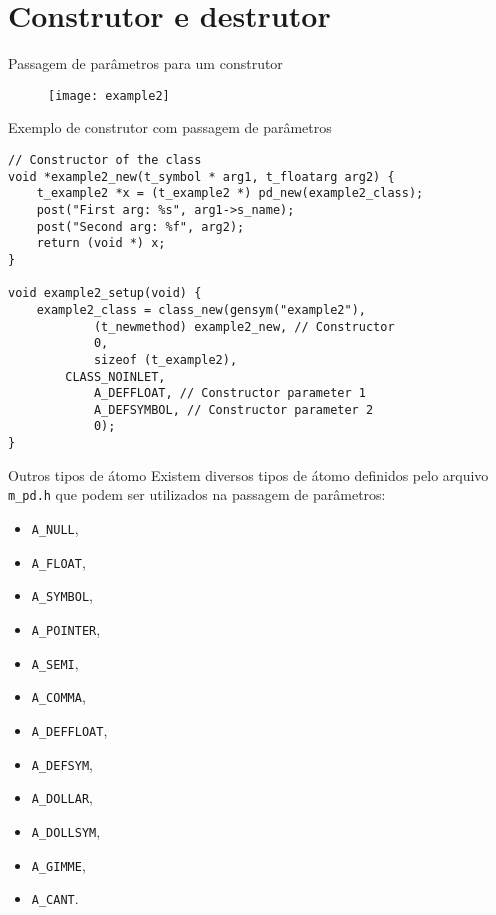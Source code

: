 \section{Construtor e destrutor}


\begin{frame}{Passagem de parâmetros para um construtor}
\begin{figure}
\centering
\texttt{[image: example2]}
\end{figure}
\end{frame}


\begin{frame}[fragile]{Exemplo de construtor com passagem de parâmetros}
\begin{lstlisting}
// Constructor of the class
void *example2_new(t_symbol * arg1, t_floatarg arg2) {
    t_example2 *x = (t_example2 *) pd_new(example2_class);
    post("First arg: %s", arg1->s_name);
    post("Second arg: %f", arg2);
    return (void *) x;
}

void example2_setup(void) {
    example2_class = class_new(gensym("example2"),
            (t_newmethod) example2_new, // Constructor
            0,
            sizeof (t_example2),
	    CLASS_NOINLET,
            A_DEFFLOAT, // Constructor parameter 1
            A_DEFSYMBOL, // Constructor parameter 2
            0);
}
\end{lstlisting}
\end{frame}


\begin{frame}{Outros tipos de átomo}
Existem diversos tipos de átomo definidos pelo arquivo \texttt{m\_pd.h} que
podem ser utilizados na passagem de parâmetros:
\begin{itemize}
\item \texttt{A\_NULL},
\item \texttt{A\_FLOAT},
\item \texttt{A\_SYMBOL},
\item \texttt{A\_POINTER},
\item \texttt{A\_SEMI},
\item \texttt{A\_COMMA},
\item \texttt{A\_DEFFLOAT},
\item \texttt{A\_DEFSYM},
\item \texttt{A\_DOLLAR}, 
\item \texttt{A\_DOLLSYM},
\item \texttt{A\_GIMME},
\item \texttt{A\_CANT}.
\end{itemize}
\end{frame}



